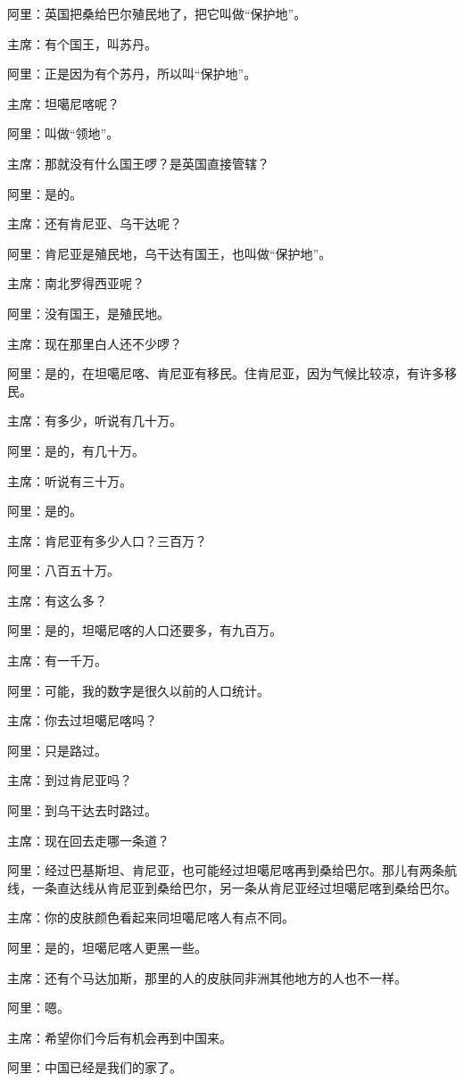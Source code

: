 阿里：英国把桑给巴尔殖民地了，把它叫做“保护地”。

主席：有个国王，叫苏丹。

阿里：正是因为有个苏丹，所以叫“保护地”。

主席：坦噶尼喀呢？

阿里：叫做“领地”。

主席：那就没有什么国王啰？是英国直接管辖？

阿里：是的。

主席：还有肯尼亚、乌干达呢？

阿里：肯尼亚是殖民地，乌干达有国王，也叫做“保护地”。

主席：南北罗得西亚呢？

阿里：没有国王，是殖民地。

主席：现在那里白人还不少啰？

阿里：是的，在坦噶尼喀、肯尼亚有移民。住肯尼亚，因为气候比较凉，有许多移民。

主席：有多少，听说有几十万。

阿里：是的，有几十万。

主席：听说有三十万。

阿里：是的。

主席：肯尼亚有多少人口？三百万？

阿里：八百五十万。

主席：有这么多？

阿里：是的，坦噶尼喀的人口还要多，有九百万。

主席：有一千万。

阿里：可能，我的数字是很久以前的人口统计。

主席：你去过坦噶尼喀吗？

阿里：只是路过。

主席：到过肯尼亚吗？

阿里：到乌干达去时路过。

主席：现在回去走哪一条道？

阿里：经过巴基斯坦、肯尼亚，也可能经过坦噶尼喀再到桑给巴尔。那儿有两条航线，一条直达线从肯尼亚到桑给巴尔，另一条从肯尼亚经过坦噶尼喀到桑给巴尔。

主席：你的皮肤颜色看起来同坦噶尼喀人有点不同。

阿里：是的，坦噶尼喀人更黑一些。

主席：还有个马达加斯，那里的人的皮肤同非洲其他地方的人也不一样。

阿里：嗯。

主席：希望你们今后有机会再到中国来。

阿里：中国已经是我们的家了。

